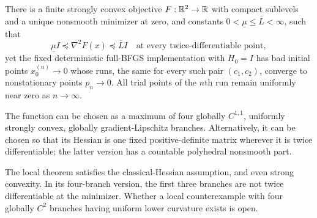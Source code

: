 \begin{theorem}\label{L:thm:local}
There is a finite strongly convex objective $F:\mathbb R^2\to\mathbb R$ with compact sublevels and a unique nonsmooth minimizer at zero, and constants $0<\underline\mu\le\overline L<\infty$, such that
\[
 \underline\mu I\preceq \nabla^2F(x)\preceq\overline L I
 \quad\text{at every twice-differentiable point},
\]
yet the fixed deterministic full-BFGS implementation with $H_0=I$ has bad initial points $x_0^{(n)}\to0$ whose runs, the same for every such pair $(c_1,c_2)$, converge to nonstationary points $p_n\to0$. All trial points of the $n$th run remain uniformly near zero as $n\to\infty$.

The function can be chosen as a maximum of four globally $C^{1,1}$, uniformly strongly convex, globally gradient-Lipschitz branches. Alternatively, it can be chosen so that its Hessian is one fixed positive-definite matrix wherever it is twice differentiable; the latter version has a countable polyhedral nonsmooth part.
\end{theorem}
\noindent The local theorem satisfies the classical-Hessian assumption, and even strong convexity. In its four-branch version, the first three branches are not twice differentiable at the minimizer. Whether a local counterexample with four globally $C^2$ branches having uniform lower curvature exists is open.


\setcounter{section}{1}
\setcounter{theorem}{2}
\setcounter{lemma}{0}
\setcounter{corollary}{0}
\setcounter{proposition}{0}
\setcounter{remark}{0}
\setcounter{equation}{0}


